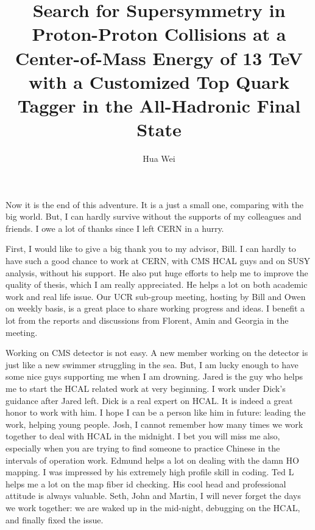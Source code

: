 \documentclass[oneside,final,letterpaper]{ucr}
\begin{document}

\title{Search for Supersymmetry in Proton-Proton Collisions at a Center-of-Mass Energy of 13 TeV with a Customized Top Quark Tagger in the All-Hadronic Final State}
\author{Hua Wei}

\maketitle
\copyrightpage{}
\approvalpage{}

\begin{frontmatter}

\begin{acknowledgements}
Now it is the end of this adventure. It is a just a small one, comparing with the big world. But, I can hardly survive without the supports of my colleagues and friends. I owe a lot of thanks since I left CERN in a hurry. 

First, I would like to give a big thank you to my advisor, Bill. I can hardly to have such a good chance to work at CERN, with CMS HCAL guys and on SUSY analysis, without his support. He also put huge efforts to help me to improve the quality of thesis, which I am really appreciated. He helps a lot on both academic work and real life issue. Our UCR sub-group meeting, hosting by Bill and Owen on weekly basis, is a great place to share working progress and ideas. I benefit a lot from the reports and discussions from Florent, Amin and Georgia in the meeting. 

Working on CMS detector is not easy. A new member working on the detector is just like a new swimmer struggling in the sea. But, I am lucky enough to have some nice guys supporting me when I am drowning. Jared is the guy who helps me to start the HCAL related work at very beginning. I work under Dick's guidance after Jared left. Dick is a real expert on HCAL. It is indeed a great honor to work with him. I hope I can be a person like him in future: leading the work, helping young people. Josh, I cannot remember how many times we work together to deal with HCAL in the midnight. I bet you will miss me also, especially when you are trying to find someone to practice Chinese in the intervals of operation work. Edmund helps a lot on dealing with the damn HO mapping. I was impressed by his extremely high profile skill in coding. Ted L helps me a lot on the map fiber id checking. His cool head and professional attitude is always valuable. Seth, John and Martin, I will never forget the days we work together: we are waked up in the mid-night, debugging on the HCAL, and finally fixed the issue. 


\end{acknowledgements}
\end{frontmatter}
\end{document}
